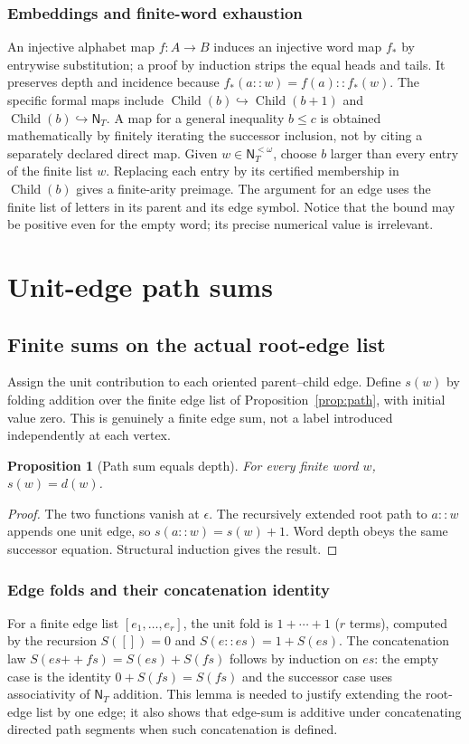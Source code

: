 \documentclass[11pt,reqno]{amsart}
\newtheorem{proposition}[theorem]{Proposition}
\theoremstyle{definition}\newtheorem{definition}[theorem]{Definition}
\theoremstyle{remark}\newtheorem{remark}[theorem]{Remark}
\newcommand{\N}{\mathsf N_T}\newcommand{\Z}{\mathsf Z_T}\newcommand{\Q}{\mathsf Q_T}\newcommand{\RR}{\mathsf R}
\newcommand{\Fin}{\operatorname{Child}}
\begin{document}
\subsubsection*{Embeddings and finite-word exhaustion}\label{supp:2-6}
An injective alphabet map $f:A\to B$ induces an injective word map $f_*$ by entrywise substitution; a proof by induction strips the equal heads and tails. It preserves depth and incidence because $f_*(a::w)=f(a)::f_*(w)$. The specific formal maps include $\Fin(b)\hookrightarrow\Fin(b+1)$ and $\Fin(b)\hookrightarrow\N$. A map for a general inequality $b\le c$ is obtained mathematically by finitely iterating the successor inclusion, not by citing a separately declared direct map. Given $w\in\N^{<\omega}$, choose $b$ larger than every entry of the finite list $w$. Replacing each entry by its certified membership in $\Fin(b)$ gives a finite-arity preimage. The argument for an edge uses the finite list of letters in its parent and its edge symbol. Notice that the bound may be positive even for the empty word; its precise numerical value is irrelevant.
\medskip

\clearpage
\section{Unit-edge path sums}\label{sec:pathsum}
\subsection{Finite sums on the actual root-edge list}\label{main:sub-05}
Assign the unit contribution to each oriented parent--child edge. Define $s(w)$ by folding addition over the finite edge list of Proposition~\ref{prop:path}, with initial value zero. This is genuinely a finite edge sum, not a label introduced independently at each vertex.
\begin{proposition}[Path sum equals depth]\label{prop:pathsum}
For every finite word $w$, $s(w)=d(w)$.
\end{proposition}
\begin{proof}
The two functions vanish at $\epsilon$. The recursively extended root path to $a::w$ appends one unit edge, so $s(a::w)=s(w)+1$. Word depth obeys the same successor equation. Structural induction gives the result.
\end{proof}

\medskip
\subsubsection*{Edge folds and their concatenation identity}\label{supp:3-1}
For a finite edge list $[e_1,\ldots,e_r]$, the unit fold is $1+\cdots+1$ ($r$ terms), computed by the recursion $S([])=0$ and $S(e::es)=1+S(es)$. The concatenation law $S(es\mathbin{+\!+}fs)=S(es)+S(fs)$ follows by induction on $es$: the empty case is the identity $0+S(fs)=S(fs)$ and the successor case uses associativity of $\N$ addition. This lemma is needed to justify extending the root-edge list by one edge; it also shows that edge-sum is additive under concatenating directed path segments when such concatenation is defined.
\medskip
\medskip
\end{document}

